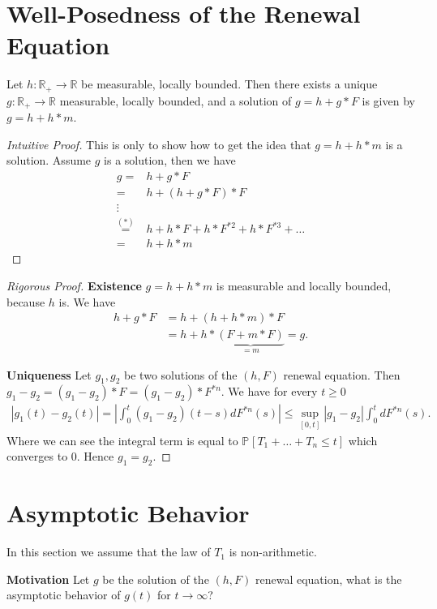 \section{Well-Posedness of the Renewal Equation}
\begin{theorem}[]
	Let $h: \mathbb{R}_+\to \mathbb{R}$ be measurable, locally bounded. Then there exists a unique $g: \mathbb{R}_+ \to \mathbb{R}$ measurable, locally bounded, and a solution of $g = h + g*F$ is given by $g=h+h*m$. 
\end{theorem}
{\color{blue}
\begin{proof}[Intuitive Proof]
	This is only to show how to get the idea that $g=h+h*m$ is a solution. Assume $g$ is a solution, then we have 
\begin{align}
	g =& h + g*F \\
	=& h + (h+g*F)*F \\
	 \vdots  \\
	\stackrel{(*)}{=}& h + h*F + h*F^{*2} + h*F^{*3}+ \ldots  \\
	=& h + h*m
\end{align}
\end{proof}
}
\begin{proof}[Rigorous Proof]
	\textbf{Existence} 
	$g = h + h*m$ is measurable and locally bounded, because $h$ is. We have 
	\begin{align}
		h + g*F &= h + (h+h*m)*F \\
			&= h + h*\underbrace{(F+m*F)}_{=m}= g.
	\end{align}

\textbf{Uniqueness} 
Let $g_1, g_2$ be two solutions of the $(h,F)$ renewal equation. Then $g_1-g_2 = (g_1 - g_2)*F = (g_1 - g_2) * F^{*n}$. We have for every $t \geq 0$
\begin{align}
	 |g_1(t) - g_2(t)| = \left| \int_{0}^{t} (g_1 - g_2)(t-s)dF^{*n}(s) \right| \leq \sup_{[0,t]} |g_1 - g_2| \int_{0}^{t} dF^{*n}(s).
\end{align}
Where we can see the integral term is equal to $\mathbb{P}_{} \left[ T_1 + \ldots  +T_n \leq t \right] $ which converges to 0. Hence $g_1 = g_2$.
\end{proof}

\section{Asymptotic Behavior}
In this section we assume that the law of $T_1$ is non-arithmetic.

\noindent
\textbf{Motivation} Let $g$ be the solution of the $(h,F)$ renewal equation, what is the asymptotic behavior of $g(t)$ for $t\to \infty$?

